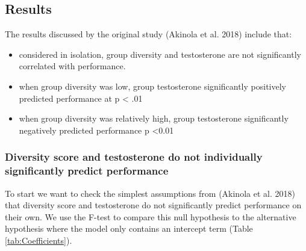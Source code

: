 \documentclass[]{article}
\providecommand{\tightlist}{%
  \setlength{\itemsep}{0pt}\setlength{\parskip}{0pt}}
\begin{document}
\hypertarget{results}{%
\subsection{Results}\label{results}}

The results discussed by the original study (Akinola et al. 2018)
include that:

\begin{itemize}
\tightlist
\item
  considered in isolation, group diversity and testosterone are not
  significantly correlated with performance.
\item
  when group diversity was low, group testosterone significantly
  positively predicted performance at p \textless{} .01
\item
  when group diversity was relatively high, group testosterone
  significantly negatively predicted performance p \textless{}0.01
\end{itemize}

\hypertarget{diversity-score-and-testosterone-do-not-individually-significantly-predict-performance}{%
\subsubsection{Diversity score and testosterone do not individually
significantly predict
performance}\label{diversity-score-and-testosterone-do-not-individually-significantly-predict-performance}}

To start we want to check the simplest assumptions from (Akinola et al.
2018) that diversity score and testosterone do not significantly predict
performance on their own. We use the F-test to compare this null
hypothesis to the alternative hypothesis where the model only contains
an intercept term (Table \ref{tab:Coefficients}).
\end{document}
